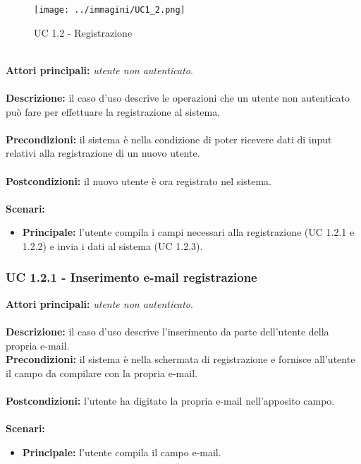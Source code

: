 \documentclass[a4paper,11pt]{article}
\begin{document}
\begin{figure}[h!]
\centering
\texttt{[image: ../immagini/UC1\_2.png]}
\caption{UC 1.2 - Registrazione}
\end{figure}
\ \\
\textbf{Attori principali:} \textit{utente non autenticato}.\\
\\
\textbf{Descrizione:} il caso d'uso descrive le operazioni che un utente non autenticato può fare per effettuare la registrazione al sistema. \\
\\
\textbf{Precondizioni:} il sistema è nella condizione di poter ricevere dati di input relativi alla registrazione di un nuovo utente.\\
\\
\textbf{Postcondizioni:} il nuovo utente è ora registrato nel sistema. \\
\\
\textbf{Scenari:}
\begin{itemize}
\item \textbf{Principale:} l'utente compila i campi necessari alla registrazione (UC 1.2.1 e 1.2.2) e invia i dati al sistema (UC 1.2.3).

\end{itemize}
\vspace{6 mm}
\subsubsection{UC 1.2.1 - Inserimento e-mail registrazione}

\textbf{Attori principali:} \textit{utente non autenticato}.\\
\\
\textbf{Descrizione:} il caso d'uso descrive l'inserimento da parte dell'utente della propria e-mail.
\\
\textbf{Precondizioni:} il sistema è nella schermata di registrazione e fornisce all'utente il campo da compilare con la propria e-mail.\\
\\
\textbf{Postcondizioni:} l'utente ha digitato la propria e-mail nell'apposito campo. \\
\\
\textbf{Scenari:}
\begin{itemize}
\item \textbf{Principale:} l'utente compila il campo e-mail.

\end{itemize}
\vspace{6 mm}
\end{document}
